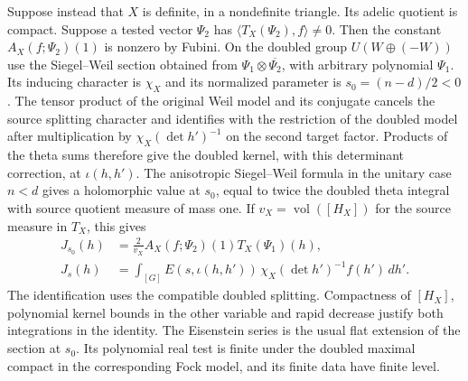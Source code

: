 Suppose instead that \(X\) is definite, in a nondefinite triangle.
Its adelic quotient is compact. Suppose a tested vector \(\Psi_2\)
has \(\langle T_X(\Psi_2),f\rangle\ne0\). Then the constant
\(A_X(f;\Psi_2)(1)\) is nonzero by Fubini. On the doubled group
\(U(W\oplus(-W))\) use the Siegel--Weil section obtained from
\(\Psi_1\otimes\overline{\Psi_2}\), with arbitrary polynomial
\(\Psi_1\). Its inducing character is \(\chi_X\) and its normalized
parameter is \(s_0=(n-d)/2<0\). The tensor product of the original
Weil model and its conjugate cancels the source splitting character
and identifies with the restriction of the doubled model after
multiplication by \(\chi_X(\det h')^{-1}\) on the second target
factor. Products of the theta sums therefore give the doubled
kernel, with this determinant correction, at \(\iota(h,h')\).
The anisotropic Siegel--Weil formula in the unitary case \(n<d\)
gives a holomorphic value at \(s_0\), equal to twice the doubled
theta integral with source quotient measure of mass one. If
\(v_X=\operatorname{vol}([H_X])\) for the source measure in
\(T_X\), this gives
\[
 \begin{split}
 J_{s_0}(h)&=\frac{2}{v_X}A_X(f;\Psi_2)(1)T_X(\Psi_1)(h),\\
 J_s(h)&=\int_{[G]} E(s,\iota(h,h'))\,
                  \chi_X(\det h')^{-1} f(h')\,dh'.
 \end{split}
\]
The identification uses the compatible doubled splitting.
Compactness of \([H_X]\), polynomial kernel bounds in the other
variable and rapid decrease justify both integrations in the
identity. The Eisenstein series is the usual flat extension of the
section at \(s_0\). Its polynomial real test is finite under the
doubled maximal compact in the corresponding Fock model, and its
finite data have finite level.
\cite[\S3.1, Theorem~7.1 and \S11.3]{gqt}
\cite[Theorems~2.1 and 2.2]{p2yamana-singular-siegel-weil}

